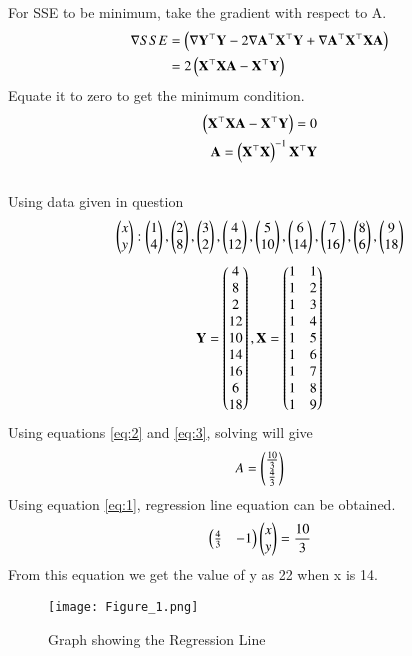 \documentclass[journal,12pt,twocolumn]{IEEEtran}
\begin{document}
For SSE to be minimum, take the gradient with respect to A.
\begin{align}
      	 \nabla
      		SSE
      		&=\left(\nabla\mathbf{Y}^{\top}\mathbf{Y}-2\nabla\mathbf{A}^{\top}\mathbf{X}^{\top}\mathbf{Y}+\nabla\mathbf{A}^{\top}\mathbf{X}^{\top}\mathbf{X}\mathbf{A}\right)\\
      		&=2\left(\mathbf{X}^{\top}\mathbf{X}\mathbf{A}-\mathbf{X}^{\top}\mathbf{Y}\right)
\end{align}
Equate it to zero to get the minimum condition.
\begin{align}
       \left(\mathbf{X}^{\top}\mathbf{X}\mathbf{A}-\mathbf{X}^{\top}\mathbf{Y}\right)=0\\
       \mathbf{A}=\left(\mathbf{X}^{\top}\mathbf{X}\right)^{-1}\mathbf{X}^{\top}\mathbf{Y}\label{eq:2}
\end{align}\\
Using data given in question\\
\begin{align}
	\begin{pmatrix}x \\y \end{pmatrix}:
	\begin{pmatrix}1 \\4 \end{pmatrix},
	\begin{pmatrix}2 \\8 \end{pmatrix},
	\begin{pmatrix}3 \\2 \end{pmatrix},
    \begin{pmatrix}4 \\12 \end{pmatrix},
    \begin{pmatrix}5 \\10 \end{pmatrix},
    \begin{pmatrix}6 \\14 \end{pmatrix},
    \begin{pmatrix}7 \\16 \end{pmatrix},
    \begin{pmatrix}8 \\6 \end{pmatrix},
    \begin{pmatrix}9 \\18 \end{pmatrix}
\end{align}
\begin{align}
	\mathbf{Y}=\begin{pmatrix}4\\8\\2\\12\\10\\14\\16\\6\\18\end{pmatrix},
	\mathbf{X}=\begin{pmatrix}1&1\\1&2\\1&3\\1&4\\1&5\\1&6\\1&7\\1&8\\1&9\end{pmatrix}\label{eq:3}
\end{align}
Using equations \eqref{eq:2} and \eqref{eq:3}, solving will give
\begin{align}
	A=\begin{pmatrix}\frac{10}{3}\\\frac{4}{3}\end{pmatrix}
\end{align}
Using equation \eqref{eq:1}, regression line equation can be obtained.
\begin{align}
    \begin{pmatrix}\frac{4}{3} & -1\end{pmatrix}\begin{pmatrix}x\\y\end{pmatrix}= \frac{10}{3}
\end{align}
From this equation we get the value of y as 22 when x is 14.\\
\begin{figure}[ht]
    \centering
    \texttt{[image: Figure\_1.png]}
    \caption{Graph showing the Regression Line}
    \label{Figure_1}
\end{figure}\\
\end{document}
